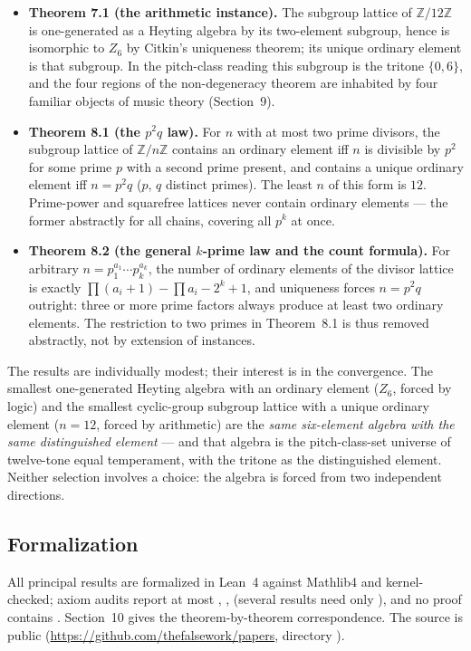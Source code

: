 ﻿\documentclass[11pt]{amsart}
\theoremstyle{plain}
\theoremstyle{definition}
\theoremstyle{remark}
\newcommand{\ZZ}{\mathbb{Z}}
\newcommand{\Znn}[1]{Z_{#1}}
\begin{document}
\begin{itemize}
\item \textbf{Theorem 7.1 (the arithmetic instance).} The subgroup lattice of
$\ZZ/12\ZZ$ is one-generated as a Heyting algebra by its two-element
subgroup, hence is isomorphic to $\Znn{6}$ by Citkin's uniqueness theorem;
its unique ordinary element is that subgroup. In the pitch-class reading this
subgroup is the tritone $\{0, 6\}$, and the four regions of the
non-degeneracy theorem are inhabited by four familiar objects of music theory
(Section~9).
\item \textbf{Theorem 8.1 (the $p^2 q$ law).} For $n$ with at most two prime
divisors, the subgroup lattice of $\ZZ/n\ZZ$ contains an ordinary element iff
$n$ is divisible by $p^2$ for some prime $p$ with a second prime present, and
contains a unique ordinary element iff $n = p^2 q$ ($p$, $q$ distinct
primes). The least $n$ of this form is $12$. Prime-power and squarefree
lattices never contain ordinary elements --- the former abstractly for all
chains, covering all $p^k$ at once.
\item \textbf{Theorem 8.2 (the general $k$-prime law and the count formula).}
For arbitrary $n = p_1^{a_1} \cdots p_k^{a_k}$, the number of ordinary
elements of the divisor lattice is exactly
$\prod (a_i + 1) - \prod a_i - 2^k + 1$, and uniqueness forces $n = p^2 q$
outright: three or more prime factors always produce at least two ordinary
elements. The restriction to two primes in Theorem~8.1 is thus removed
abstractly, not by extension of instances.
\end{itemize}

The results are individually modest; their interest is in the convergence.
The smallest one-generated Heyting algebra with an ordinary element
($\Znn{6}$, forced by logic) and the smallest cyclic-group subgroup lattice
with a unique ordinary element ($n = 12$, forced by arithmetic) are the
\emph{same six-element algebra with the same distinguished element} --- and
that algebra is the pitch-class-set universe of twelve-tone equal temperament,
with the tritone as the distinguished element. Neither selection involves a
choice: the algebra is forced from two independent directions.

\subsection*{Formalization}
All principal results are formalized in Lean~4 against Mathlib4 and
kernel-checked; axiom audits report at most ,
,  (several results need only
), and no proof contains . Section~10 gives the
theorem-by-theorem correspondence. The source is public
(\url{https://github.com/thefalsework/papers}, directory
).
\end{document}
